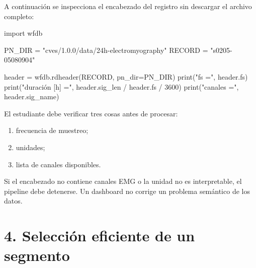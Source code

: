 \documentclass[
  spanish,
  a4paper,
  DIV=11,
  numbers=noendperiod]{scrreprt}
\newenvironment{Shaded}{\begin{snugshade}}{\end{snugshade}}
\newcommand{\BuiltInTok}[1]{\textcolor[rgb]{0.00,0.23,0.31}{#1}}
\newcommand{\DecValTok}[1]{\textcolor[rgb]{0.68,0.00,0.00}{#1}}
\newcommand{\ImportTok}[1]{\textcolor[rgb]{0.00,0.46,0.62}{#1}}
\newcommand{\NormalTok}[1]{\textcolor[rgb]{0.00,0.23,0.31}{#1}}
\newcommand{\OperatorTok}[1]{\textcolor[rgb]{0.37,0.37,0.37}{#1}}
\newcommand{\StringTok}[1]{\textcolor[rgb]{0.13,0.47,0.30}{#1}}
\providecommand{\tightlist}{%
  \setlength{\itemsep}{0pt}\setlength{\parskip}{0pt}}
\begin{document}
A continuación se inspecciona el encabezado del registro sin descargar
el archivo completo:

\begin{Shaded}
\begin{Highlighting}[]
\ImportTok{import}\NormalTok{ wfdb}

\NormalTok{PN\_DIR }\OperatorTok{=} \StringTok{"cves/1.0.0/data/24h{-}electromyography"}
\NormalTok{RECORD }\OperatorTok{=} \StringTok{"s0205{-}05080904"}

\NormalTok{header }\OperatorTok{=}\NormalTok{ wfdb.rdheader(RECORD, pn\_dir}\OperatorTok{=}\NormalTok{PN\_DIR)}
\BuiltInTok{print}\NormalTok{(}\StringTok{"fs ="}\NormalTok{, header.fs)}
\BuiltInTok{print}\NormalTok{(}\StringTok{"duración [h] ="}\NormalTok{, header.sig\_len }\OperatorTok{/}\NormalTok{ header.fs }\OperatorTok{/} \DecValTok{3600}\NormalTok{)}
\BuiltInTok{print}\NormalTok{(}\StringTok{"canales ="}\NormalTok{, header.sig\_name)}
\end{Highlighting}
\end{Shaded}

El estudiante debe verificar tres cosas antes de procesar:

\begin{enumerate}
\def\labelenumi{\arabic{enumi}.}
\tightlist
\item
  frecuencia de muestreo;
\item
  unidades;
\item
  lista de canales disponibles.
\end{enumerate}

\begin{tcolorbox}[enhanced jigsaw, arc=.35mm, bottomrule=.15mm, bottomtitle=1mm, breakable, colback=white, colbacktitle=quarto-callout-important-color!10!white, colframe=quarto-callout-important-color-frame, coltitle=black, left=2mm, leftrule=.75mm, opacityback=0, opacitybacktitle=0.6, rightrule=.15mm, title=\textcolor{quarto-callout-important-color}{\faExclamation}\hspace{0.5em}{Punto de verificación}, titlerule=0mm, toprule=.15mm, toptitle=1mm]

Si el encabezado no contiene canales EMG o la unidad no es
interpretable, el pipeline debe detenerse. Un dashboard no corrige un
problema semántico de los datos.

\end{tcolorbox}

\chapter{4. Selección eficiente de un
segmento}\label{selecciuxf3n-eficiente-de-un-segmento}
\end{document}
